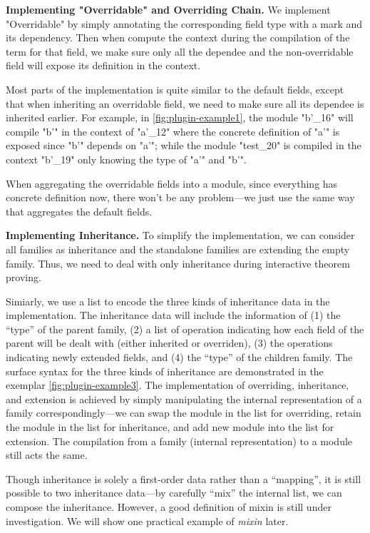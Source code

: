 \textbf{Implementing "Overridable" and Overriding Chain.}
We implement "Overridable" by simply annotating the corresponding field type with a mark and its dependency. Then when compute the context during the compilation of the term for that field, we make sure only all the dependee and the non-overridable field will expose its definition in the context. 

Most parts of the implementation is quite similar to the default fields, except that when inheriting an overridable field, we need to make sure all its dependee is inherited earlier.  For example, in \cref{fig:plugin-example1}, the module "b'_16" will compile "b'" in the context of "a'_12" where the concrete definition of "a'" is exposed since "b'" depends on "a'"; while the module "test_20" is compiled in the context "b'_19" only knowing the type of "a'" and "b'".

When aggregating the overridable fields into a module, since everything has concrete definition now, there won't be any problem---we just use the same way that aggregates the default fields.



\textbf{Implementing Inheritance.}
To simplify the implementation, we can consider all families as
inheritance and the standalone families are extending the empty family.
Thus, we need to deal with only inheritance during interactive theorem proving.


Simiarly, we
use a list to encode the three kinds of inheritance data in the
implementation. The inheritance data will include the
information of (1) the ``type'' of the parent family, (2) a list of
operation indicating how each field of the parent will be dealt with
(either inherited or overriden), (3) the operations indicating newly
extended fields, and (4) the ``type'' of the children family.
The surface syntax for the three kinds of inheritance
are demonstrated in the exemplar \cref{fig:plugin-example3}. The
implementation of overriding, inheritance, and extension is achieved by
simply manipulating the internal representation of a family
correspondingly---we can swap the module in the list for overriding,
retain the module in the list for inheritance, and add new module into
the list for extension. The compilation from a family (internal
representation) to a module still acts the same.

Though inheritance is solely a first-order data rather
than a ``mapping'', it is still possible to  two inheritance
data---by carefully ``mix'' the internal list, we can compose the
inheritance. However, a good definition of mixin is still under
investigation. We will show one practical example of \textit{mixin}
later.

